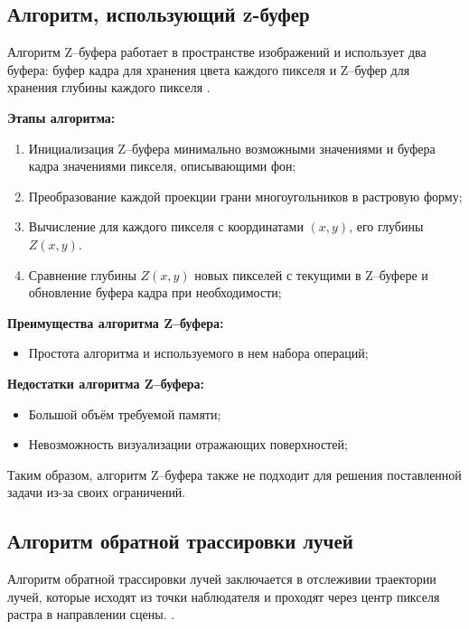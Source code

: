 \subsection{Алгоритм, использующий z-буфер}
Алгоритм Z--буфера работает в пространстве изображений и использует два буфера: буфер кадра для хранения цвета каждого
пикселя и Z--буфер для хранения глубины каждого пикселя \cite{shikinStCG}.

\textbf{Этапы алгоритма:}
\begin{enumerate}[label=\arabic*)]
	\item Инициализация Z--буфера минимально возможными значениями и буфера кадра значениями пикселя, описывающими фон;
	\item Преобразование каждой проекции грани многоугольников в растровую форму;
	\item Вычисление для каждого пикселя с координатами $(x, y)$, его глубины $Z(x, y)$.
	\item Сравнение глубины $Z(x, y)$ новых пикселей с текущими в Z--буфере и обновление буфера кадра при необходимости;
\end{enumerate}

\textbf{Преимущества алгоритма Z--буфера:}
\begin{itemize}
	\item Простота алгоритма и используемого в нем набора операций;
\end{itemize}

\textbf{Недостатки алгоритма Z--буфера:}
\begin{itemize}
	\item Большой объём требуемой памяти;
	\item Невозможность визуализации отражающих поверхностей;
\end{itemize}

Таким образом, алгоритм Z--буфера также не подходит для решения поставленной задачи из-за своих ограничений.

\subsection{Алгоритм обратной трассировки лучей}
Алгоритм обратной трассировки лучей заключается в отслеживии траектории лучей, которые исходят из точки наблюдателя и проходят через центр пикселя растра в направлении сцены. \cite{shikinDinamica}.

